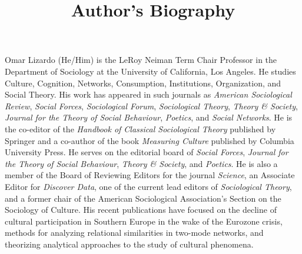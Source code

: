 \documentclass[a4paper,12pt]{extarticle}
\title{Author's Biography}
\begin{document}
\maketitle
Omar Lizardo (He/Him) is the LeRoy Neiman Term Chair Professor in the Department of Sociology at the University of California, Los Angeles. He studies Culture, Cognition, Networks, Consumption, Institutions, Organization, and Social Theory. His work has appeared in such journals as \textit{American Sociological Review}, \textit{Social Forces}, \textit{Sociological Forum}, \textit{Sociological Theory}, \textit{Theory \& Society}, \textit{Journal for the Theory of Social Behaviour}, \textit{Poetics}, and \textit{Social Networks}. He is the co-editor of the \textit{Handbook of Classical Sociological Theory} published by Springer and a co-author of the book \textit{Measuring Culture} published by Columbia University Press. He serves on the editorial board of \textit{Social Forces}, \textit{Journal for the Theory of Social Behaviour}, \textit{Theory \& Society}, and \textit{Poetics}. He is also a member of the Board of Reviewing Editors for the journal \textit{Science}, an Associate Editor for \textit{Discover Data}, one of the current lead editors of \textit{Sociological Theory}, and a former chair of the American Sociological Association's Section on the Sociology of Culture. His recent publications have focused on the decline of cultural participation in Southern Europe in the wake of the Eurozone crisis, methods for analyzing relational similarities in two-mode networks, and theorizing analytical approaches to the study of cultural phenomena.
\end{document}
